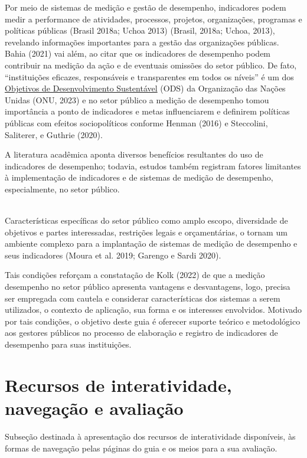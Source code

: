 \documentclass[
  letterpaper,
  DIV=11,
  numbers=noendperiod]{scrreprt}
\begin{document}
Por meio de sistemas de medição e gestão de desempenho, indicadores
podem medir a performance de atividades, processos, projetos,
organizações, programas e políticas públicas (Brasil 2018a; Uchoa 2013)
(Brasil, 2018a; Uchoa, 2013), revelando informações importantes para a
gestão das organizações públicas. Bahia (2021) vai além, ao citar que os
indicadores de desempenho podem contribuir na medição da ação e de
eventuais omissões do setor público. De fato, ``instituições eficazes,
responsáveis e transparentes em todos os níveis'' é um dos
\href{https://brasil.un.org/pt-br/sdgs}{Objetivos de Desenvolvimento
Sustentável} (ODS) da Organização das Nações Unidas (ONU, 2023) e no
setor público a medição de desempenho tomou importância a ponto de
indicadores e metas influenciarem e definirem políticas públicas com
efeitos sociopolíticos conforme Henman (2016) e Steccolini, Saliterer, e
Guthrie (2020).

A literatura acadêmica aponta diversos benefícios resultantes do uso de
indicadores de desempenho; todavia, estudos também registram fatores
limitantes à implementação de indicadores e de sistemas de medição de
desempenho, especialmente, no setor público.

\strut \\
Características específicas do setor público como amplo escopo,
diversidade de objetivos e partes interessadas, restrições legais e
orçamentárias, o tornam um ambiente complexo para a implantação de
sistemas de medição de desempenho e seus indicadores (Moura et al. 2019;
Garengo e Sardi 2020).

Tais condições reforçam a constatação de Kolk (2022) de que a medição
desempenho no setor público apresenta vantagens e desvantagens, logo,
precisa ser empregada com cautela e considerar características dos
sistemas a serem utilizados, o contexto de aplicação, sua forma e os
interesses envolvidos. Motivado por tais condições, o objetivo deste
guia é oferecer suporte teórico e metodológico aos gestores públicos no
processo de elaboração e registro de indicadores de desempenho para suas
instituições.

\hypertarget{recursos-de-interatividade-navegauxe7uxe3o-e-avaliauxe7uxe3o}{%
\chapter{Recursos de interatividade, navegação e
avaliação}\label{recursos-de-interatividade-navegauxe7uxe3o-e-avaliauxe7uxe3o}}

{Subseção destinada à apresentação dos recursos de interatividade
disponíveis, às formas de navegação pelas páginas do guia e os meios
para a sua avaliação.}
\end{document}
